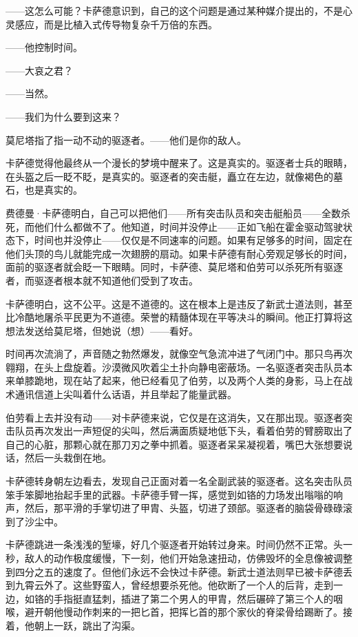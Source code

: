 \documentclass[AutoFakeBold=true]{book}
\begin{document}
{\kaishu ——这怎么可能？}卡萨德意识到，自己的这个问题是通过某种媒介提出的，不是心灵感应，而是比植入式传导物复杂千万倍的东西。

{\kaishu ——他控制时间。}

{\kaishu ——大哀之君？}

{\kaishu ——当然。}

{\kaishu ——我们为什么要到这来？}

莫尼塔指了指一动不动的驱逐者。{\kaishu ——他们是你的敌人。}

卡萨德觉得他最终从一个漫长的梦境中醒来了。这是真实的。驱逐者士兵的眼睛，在头盔之后一眨不眨，是真实的。驱逐者的突击艇，矗立在左边，就像褐色的墓石，也是真实的。

费德曼·卡萨德明白，自己可以把他们——所有突击队员和突击艇船员——全数杀死，而他们什么都做不了。他知道，时间并没停止——正如飞船在霍金驱动驾驶状态下，时间也并没停止——仅仅是不同速率的问题。如果有足够多的时间，固定在他们头顶的鸟儿就能完成一次翅膀的扇动。如果卡萨德有耐心旁观足够长的时间，面前的驱逐者就会眨一下眼睛。同时，卡萨德、莫尼塔和伯劳可以杀死所有驱逐者，而驱逐者根本就不知道他们受到了攻击。

卡萨德明白，这不公平。这是不道德的。这在根本上是违反了新武士道法则，甚至比冷酷地屠杀平民更为不道德。荣誉的精髓体现在平等决斗的瞬间。他正打算将这想法发送给莫尼塔，但她说（想）{\kaishu ——看好}。

时间再次流淌了，声音随之勃然爆发，就像空气急流冲进了气闭门中。那只鸟再次翱翔，在头上盘旋着。沙漠微风吹着尘土扑向静电密蔽场。一名驱逐者突击队员本来单膝跪地，现在站了起来，他已经看见了伯劳，以及两个人类的身影，马上在战术通讯信道上尖叫着什么话语，并且举起了能量武器。

伯劳看上去并没有动——对卡萨德来说，它仅是在这消失，又在那出现。驱逐者突击队员再次发出一声短促的尖叫，然后满面质疑地低下头，看着伯劳的臂膀取出了自己的心脏，那颗心就在那刀刃之拳中抓着。驱逐者呆呆凝视着，嘴巴大张想要说话，然后一头栽倒在地。

卡萨德转身朝左边看去，发现自己正面对着一名全副武装的驱逐者。这名突击队员笨手笨脚地抬起手里的武器。卡萨德手臂一挥，感觉到如铬的力场发出嗡嗡的响声，然后，那平滑的手掌切进了甲胄、头盔，切进了颈部。驱逐者的脑袋骨碌碌滚到了沙尘中。

卡萨德跳进一条浅浅的堑壕，好几个驱逐者开始转过身来。时间仍然不正常。头一秒，敌人的动作极度缓慢，下一刻，他们开始急速扭动，仿佛毁坏的全息像被调整到四分之五的速度了。但他们永远不会快过卡萨德。新武士道法则早已被卡萨德丢到九霄云外了。这些野蛮人，曾经想要杀死他。他砍断了一个人的后背，走到一边，如铬的手指挺直猛刺，插进了第二个男人的甲胄，然后碾碎了第三个人的咽喉，避开朝他慢动作刺来的一把匕首，把挥匕首的那个家伙的脊梁骨给踢断了。接着，他朝上一跃，跳出了沟渠。
\end{document}
